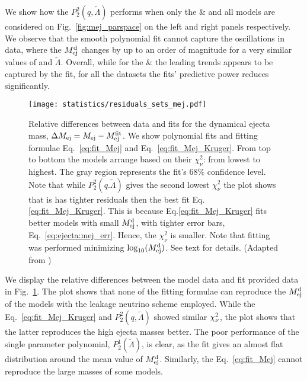 We show how the $P_2^2(q,\tilde{\Lambda})$ performs when only the 
\DSrefset{} \& \DSheatcool{} and all models are considered on Fig.~\ref{fig:mej_parspace} 
on the left and right panels respectively. 
We observe that the smooth polynomial fit cannot capture the oscillations in data, where 
the $M^{\text{d}}_{\text{ej}}$ changes by up to an order of magnitude for a very similar values of \mr{} and 
$\tilde{\Lambda}$. Overall, while for the \DSrefset{} \& \DSheatcool{} the leading trends 
appears to be captured by the fit, for all the datasets the fits' predictive power 
reduces significantly.
%
\begin{figure}[t]
    \centering 
    \texttt{[image: statistics/residuals\_sets\_mej.pdf]}
    \caption{
        Relative differences between data and fits for the dynamical ejecta
        mass, $\Delta M_{\rm ej} = M_{\rm ej} - M^{\rm fit}_{\rm ej}$.
        We show polynomial fits and fitting formulae
        Eq.~\eqref{eq:fit_Mej} and Eq.~\eqref{eq:fit_Mej_Kruger}.
        From top to bottom the models arrange based on their $\chi_{\nu}^2$: from lowest to highest.
        The gray region represents the fit's $68\%$ confidence level.
        Note that while $P_2^2(q.\tilde{\Lambda})$ gives the second lowest $\chi_{\nu}^2$
        the plot shows that is has tighter residuals then the best fit Eq.\eqref{eq:fit_Mej_Kruger}.
        This is because Eq.\eqref{eq:fit_Mej_Kruger} fits better models with small $M^{\text{d}}_{\text{ej}}$,
        with tighter error bars, Eq.~\eqref{eq:ejecta:mej_err}. Hence,
        the $\chi_{\nu}^2$ is smaller.
        Note that fitting was performed minimizing $\log_{10}(M^{\text{d}}_{\text{ej}})$. See text for details.
        (Adapted from \citet{Nedora:2020qtd})
    }
    \label{fig:ejecta:dyn:m}
\end{figure}


We display the relative differences between the model data and fit provided data in 
Fig.~\ref{fig:ejecta:dyn:m}. The plot shows that none of the fitting formulae can 
reproduce the $M^{\text{d}}_{\text{ej}}$ of the \DScool{} models with the leakage neutrino scheme employed.
%
While the Eq.~\eqref{eq:fit_Mej_Kruger} and $P_2^2(q,\tilde{\Lambda})$ showed similar 
$\chi_{\nu}^2$, the plot shows that the latter reproduces the high ejecta masses better. 
The poor performance of the single parameter polynomial, $P_2^1(\tilde{\Lambda})$,
is clear, as the fit gives an almost flat distribution around the mean value of $M^{\text{d}}_{\text{ej}}$.
Similarly, the Eq.~\eqref{eq:fit_Mej} cannot reproduce the large masses of some 
models.
%

